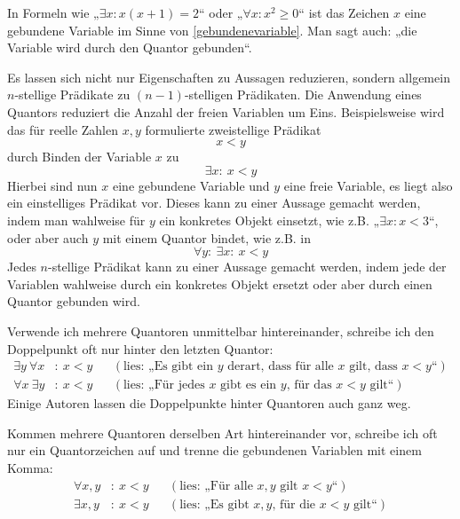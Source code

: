 \begin{bem} \label{quantorbindung}
    In Formeln wie „$\exists x: x(x+1)=2$“ oder „$\forall x: x^2\ge 0$“ ist das Zeichen $x$ eine gebundene Variable im Sinne von \cref{gebundenevariable}. Man sagt auch: „die Variable wird durch den Quantor gebunden“.

    Es lassen sich nicht nur Eigenschaften zu Aussagen reduzieren, sondern allgemein $n$-stellige Prädikate zu $(n-1)$-stelligen Prädikaten. Die Anwendung eines Quantors reduziert die Anzahl der freien Variablen um Eins. Beispielsweise wird das für reelle Zahlen $x,y$ formulierte zweistellige Prädikat
        \[ x < y \]
    durch Binden der Variable $x$ zu
        \[ \exists x:\ x<y \]
    Hierbei sind nun $x$ eine gebundene Variable und $y$ eine freie Variable, es liegt also ein einstelliges Prädikat vor. Dieses kann zu einer Aussage gemacht werden, indem man wahlweise für $y$ ein konkretes Objekt einsetzt, wie z.B. „$\exists x: x < 3$“, oder aber auch $y$ mit einem Quantor bindet, wie z.B. in
        \[ \forall y:\ \exists x:\ x < y \]
    Jedes $n$-stellige Prädikat kann zu einer Aussage gemacht werden, indem jede der Variablen wahlweise durch ein konkretes Objekt ersetzt oder aber durch einen Quantor gebunden wird.
\end{bem}
 
 
\begin{nota}
    Verwende ich mehrere Quantoren unmittelbar hintereinander, schreibe ich den Doppelpunkt oft nur hinter den letzten Quantor:
    \begin{align*}
        \exists y\ \forall x& :\ x < y && (\text{lies: „Es gibt ein $y$ derart, dass für alle $x$ gilt, dass $x<y$“}) \\
        \forall x\ \exists y& :\ x < y && (\text{lies: „Für jedes $x$ gibt es ein $y$, für das $x<y$ gilt“})  
    \end{align*}
    Einige Autoren lassen die Doppelpunkte hinter Quantoren auch ganz weg.
    
    Kommen mehrere Quantoren derselben Art hintereinander vor, schreibe ich oft nur ein Quantorzeichen auf und trenne die gebundenen Variablen mit einem Komma:
    \begin{align*}
        \forall x,y&:\ x<y && (\text{lies: „Für alle $x,y$ gilt $x<y$“}) \\
        \exists x,y&:\ x<y && (\text{lies: „Es gibt $x,y$, für die $x<y$ gilt“}) 
    \end{align*}
\end{nota}

